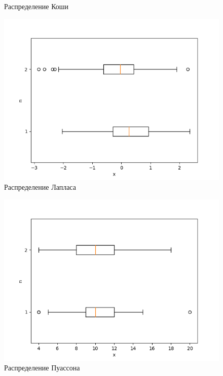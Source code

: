 \documentclass[a4]{article}
\begin{document}
\begin{center}
\begin{figure}[h]
					\caption[Распределение Коши]{Распределение Коши}
				\end{figure}
				\newpage
				\begin{figure}[h]
					\includegraphics[width=\textwidth]{laplace.png}
					\caption[Распределение Лапласа]{Распределение Лапласа}
				\end{figure}
				\newpage
				\begin{figure}[h]
					\includegraphics[width=\textwidth]{poisson.png}
					\caption[Распределение Пуассона]{Распределение Пуассона}
				\end{figure}
				\newpage
				\begin{figure}[h]

\end{figure}
\end{center}
\end{document}
